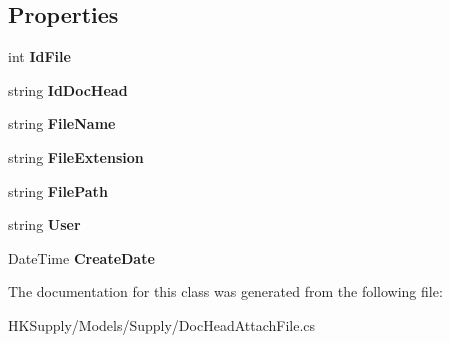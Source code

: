 \subsection*{Properties}
\begin{DoxyCompactItemize}
\item 
\mbox{\label{class_h_k_supply_1_1_models_1_1_supply_1_1_doc_head_attach_file_a8f928bfe86e6c5bfa04332a1863a8d07}} 
int {\bfseries Id\+File}
\item 
\mbox{\label{class_h_k_supply_1_1_models_1_1_supply_1_1_doc_head_attach_file_af38efefff94884cb6da9944537398c34}} 
string {\bfseries Id\+Doc\+Head}
\item 
\mbox{\label{class_h_k_supply_1_1_models_1_1_supply_1_1_doc_head_attach_file_a1d7c2d5323577a9c9a9f6d731ac0a011}} 
string {\bfseries File\+Name}
\item 
\mbox{\label{class_h_k_supply_1_1_models_1_1_supply_1_1_doc_head_attach_file_a39d7898f256061c3398371e537e8698d}} 
string {\bfseries File\+Extension}
\item 
\mbox{\label{class_h_k_supply_1_1_models_1_1_supply_1_1_doc_head_attach_file_ac201dd1664fb04977d2fcafd5edb730b}} 
string {\bfseries File\+Path}
\item 
\mbox{\label{class_h_k_supply_1_1_models_1_1_supply_1_1_doc_head_attach_file_a62980a3efc345876606b5e126e29a85b}} 
string {\bfseries User}
\item 
\mbox{\label{class_h_k_supply_1_1_models_1_1_supply_1_1_doc_head_attach_file_acc5ffdfae813256e88a60a44da3bfc60}} 
Date\+Time {\bfseries Create\+Date}
\end{DoxyCompactItemize}


The documentation for this class was generated from the following file\+:\begin{DoxyCompactItemize}
\item 
H\+K\+Supply/\+Models/\+Supply/Doc\+Head\+Attach\+File.\+cs\end{DoxyCompactItemize}
